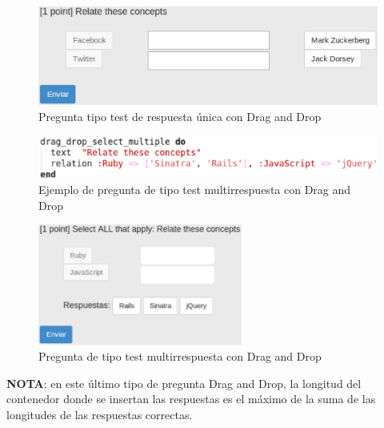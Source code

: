 \begin{itemize}
\begin{itemize}
    \begin{figure}[!th]
    \begin{center}
    \includegraphics[width=1\textwidth]{images/dd2r.eps}
    \caption{Pregunta tipo test de respuesta \'unica con Drag and Drop}
    \label{fig:dd2r}
    \end{center}
    \end{figure}
    \newpage
    
    \begin{figure}[!th]
    \begin{center}
    \includegraphics[width=1\textwidth]{images/dd3.eps}
    \caption{Ejemplo de pregunta de tipo test multirrespuesta con Drag and Drop}
    \label{fig:dd3}
    \end{center}
    \end{figure}
   
    \begin{figure}[!th]
    \begin{center}
    \includegraphics[width=0.6\textwidth]{images/dd3r.eps}
    \caption{Pregunta de tipo test multirrespuesta con Drag and Drop}
    \label{fig:dd3r}
    \end{center}
    \end{figure}
    
    {\bfseries NOTA}: en este \'ultimo tipo de pregunta Drag and Drop, la longitud del contenedor donde se insertan las 
    respuestas es el m\'aximo de la suma de las longitudes de las respuestas correctas.
    \bigskip
    

\end{itemize}
\end{itemize}
